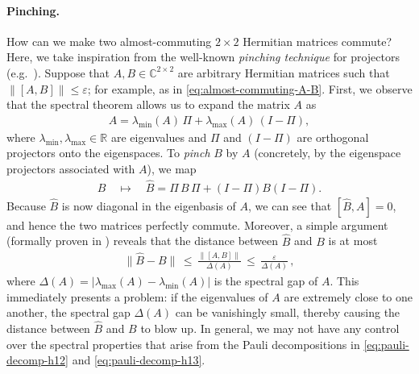 \documentclass[a4paper,onecolumn,11pt]{quantumarticle}
\theoremstyle{plain}
\newcommand{\eps}{\varepsilon}
\begin{document}
\paragraph{Pinching.} How can we make two almost-commuting $2 \times 2$ Hermitian matrices commute? Here, we take inspiration from the well-known \emph{pinching technique} for projectors (e.g.~\cite{overlapping}). Suppose that $A,B \in \mathbb{C}^{2 \times 2}$ are arbitrary Hermitian matrices such that $\|[A,B]\| \leq \eps$; for example, as in \eqref{eq:almost-commuting-A-B}. First, we observe that the spectral theorem allows us to expand the matrix $A$ as 
\begin{align}
A = \lambda_{\min}(A) \, \Pi + \lambda_{\max}(A) \, (I -\Pi),
\end{align}
where $\lambda_{\min},\lambda_{\max} \in \mathbb{R}$ are eigenvalues and $\Pi$ and $(I -\Pi)$ are orthogonal projectors onto the eigenspaces. To \emph{pinch} $B$ by $A$ (concretely, by the eigenspace projectors associated with $A$), we map
\begin{align}\label{eq:ex-pinchining}
B \quad \mapsto \quad \hat{B} = \Pi \, B \, \Pi + (I-\Pi) B (I-\Pi).     
\end{align}
Because $\hat{B}$ is now diagonal in the eigenbasis of $A$, we can see that $[\hat{B},A]=0$, and hence the two matrices perfectly commute. Moreover, a simple argument (formally proven in ) reveals that the distance between $\hat B$ and $B$ is at most
\begin{align}\label{eq:pinching-for-B}
\|\hat{B} - B\| \, \leq \, \frac{\|[A,B]\|}{\Delta(A)} \, \leq \, \frac{\eps}{\Delta(A)} \, ,
\end{align}
where $\Delta(A) = |\lambda_{\max}(A) - \lambda_{\min}(A)|$ is the spectral gap of $A$. This immediately presents a problem: if the eigenvalues of $A$ are extremely close to one another, the spectral gap $\Delta(A)$ can be vanishingly small, thereby causing the distance between $\hat{B}$ and $B$ to blow up. In general, we may not have any control over the spectral properties that arise from the Pauli decompositions in \eqref{eq:pauli-decomp-h12} and \eqref{eq:pauli-decomp-h13}. 
\end{document}
